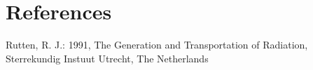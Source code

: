 \documentclass{aa}   %
\begin{document}

\section{References}
Rutten, R. J.: 1991, The Generation and Transportation of Radiation, Sterrekundig Instuut Utrecht, The Netherlands

\end{document}
